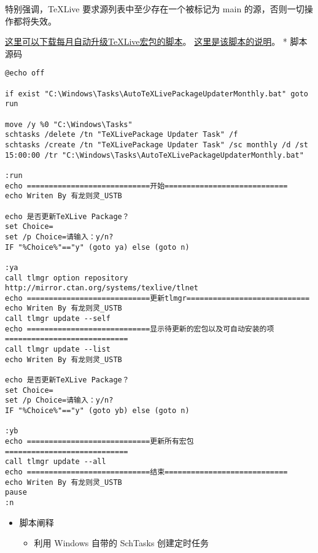 特别强调，TeXLive 要求源列表中至少存在一个被标记为 main
的源，否则一切操作都将失效。



\href{http://pd10ibe5c.bkt.clouddn.com/TeXLive\%E5\%AE\%8F\%E5\%8C\%85\%E6\%AF\%8F\%E6\%9C\%88\%E8\%87\%AA\%E5\%8A\%A8\%E6\%9B\%B4\%E6\%96\%B0.zip}{这}\href{http://pd10ibe5c.bkt.clouddn.com/TeXLive\%E5\%AE\%8F\%E5\%8C\%85\%E6\%AF\%8F\%E6\%9C\%88\%E8\%87\%AA\%E5\%8A\%A8\%E6\%9B\%B4\%E6\%96\%B0.zip}{里可以下载每月自动升级TeXLive宏包的脚本}。
\href{http://htharoldht.com/texlive-package-automatically-upgrades-every-month/}{这里是该脚本的说明}。
* 脚本源码

\begin{verbatim}
@echo off

if exist "C:\Windows\Tasks\AutoTeXLivePackageUpdaterMonthly.bat" goto run

move /y %0 "C:\Windows\Tasks"
schtasks /delete /tn "TeXLivePackage Updater Task" /f
schtasks /create /tn "TeXLivePackage Updater Task" /sc monthly /d /st 15:00:00 /tr "C:\Windows\Tasks\AutoTeXLivePackageUpdaterMonthly.bat"

:run
echo ============================开始============================
echo Writen By 有龙则灵_USTB

echo 是否更新TeXLive Package？
set Choice=
set /p Choice=请输入：y/n?
IF "%Choice%"=="y" (goto ya) else (goto n)

:ya
call tlmgr option repository http://mirror.ctan.org/systems/texlive/tlnet
echo ============================更新tlmgr============================
echo Writen By 有龙则灵_USTB
call tlmgr update --self
echo ============================显示待更新的宏包以及可自动安装的项============================
call tlmgr update --list
echo Writen By 有龙则灵_USTB

echo 是否更新TeXLive Package？
set Choice=
set /p Choice=请输入：y/n?
IF "%Choice%"=="y" (goto yb) else (goto n)

:yb
echo ============================更新所有宏包============================
call tlmgr update --all
echo ============================结束============================
echo Writen By 有龙则灵_USTB
pause
:n
\end{verbatim}

\begin{itemize}

\item
  脚本阐释

  \begin{itemize}

  \item
    利用 Windows 自带的 SchTasks 创建定时任务
  \end{itemize}
\end{itemize}


